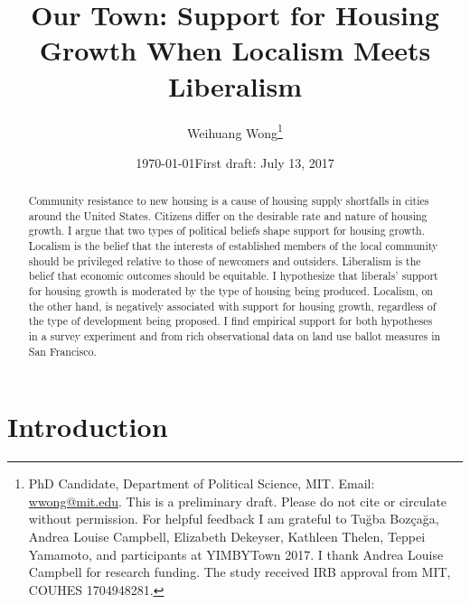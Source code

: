 \documentclass[article,12pt]{memoir}
\begin{document}
\mainmatter

\title{Our Town: Support for Housing Growth When Localism Meets Liberalism}
\author{Weihuang Wong\thanks{PhD Candidate, Department of Political Science, MIT. Email: \href{mailto:wwong@mit.edu}{wwong@mit.edu}. This is a preliminary draft. Please do not cite or circulate without permission. For helpful feedback I am grateful to Tuğba Bozçağa, Andrea Louise Campbell, Elizabeth Dekeyser, Kathleen Thelen, Teppei Yamamoto, and participants at YIMBYTown 2017. I thank Andrea Louise Campbell for research funding. The study received IRB approval from MIT, COUHES 1704948281.}}
\date{\today \newline First draft: July 13, 2017}
\maketitle

\begin{SingleSpace}
\begin{abstract} Community resistance to new housing is a cause of housing supply shortfalls in cities around the United States. Citizens differ on the desirable rate and nature of housing growth. I argue that two types of political beliefs shape support for housing growth. Localism is the belief that the interests of established members of the local community should be privileged relative to those of newcomers and outsiders. Liberalism is the belief that economic outcomes should be equitable. I hypothesize that liberals' support for housing growth is moderated by the type of housing being produced.  Localism, on the other hand, is negatively associated with support for housing growth, regardless of the type of development being proposed. I find empirical support for both hypotheses in a survey experiment and from rich observational data on land use ballot measures in San Francisco.\end{abstract}
\end{SingleSpace}

\vspace{2em}


\section{Introduction}\label{sec:hg_introduction}
\end{document}
